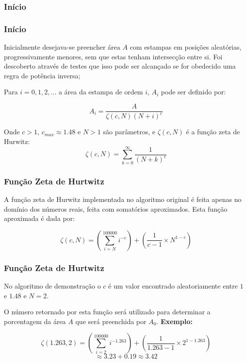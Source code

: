 \documentclass[aspectratio=169,11pt,red]{beamer}
\begin{document}
\subsubsection{Início}
\begin{frame}
\frametitle{Início}

Inicialmente desejava-se preencher área $A$ com estampas em posições aleatórias, progressivamente menores, sem que estas tenham intersecção entre si. Foi descoberto através de testes que isso pode ser alcançado se for obedecido uma regra de potência inversa;
\medskip
\pause

Para $i=0, 1, 2, ...$ a área da estampa de ordem $i$, $A_{i}$ pode ser definido por:
\medskip

\begin{equation}
A_{i} = \dfrac{A}{\zeta(c,N)(N+i)^c}
\end{equation}
\medskip

Onde $c>1$, $c_{max}\approx1.48$ e $N>1$ são parâmetros, e $\zeta(c,N)$ é a função zeta de Hurwitz: $$\zeta(c,N)=\sum\limits_{k=0}^\infty\dfrac{1}{(N+k)^c}$$
\medskip

\end{frame}

\begin{frame}
\frametitle{Função Zeta de Hurtwitz}

A função zeta de Hurwitz implementada no algoritmo original é feita apenas no domínio dos números reais, feita com somatórios aproximados. Esta função aproximada é dada por:
\medskip

\begin{equation}
\zeta(c,N) = (\sum\limits_{i=N}^{100000} i^{-c})+(\dfrac{1}{c-1} \times N^{1-c})
\end{equation}

\end{frame}

\begin{frame}
\frametitle{Função Zeta de Hurtwitz}

No algoritmo de demonstração o $c$ é um valor encontrado aleatoriamente entre $1$ e $1.48$ e $N=2$.
\medskip

O número retornado por esta função será utilizado para determinar a porcentagem da área $A$ que será preenchida por $A_{0}$. \pause \textbf{Exemplo:}
\medskip

\begin{equation}
\zeta(1.263,2) = (\sum\limits_{i=2}^{100000} i^{-1.263})+(\dfrac{1}{1.263-1} \times 2^{1-1.263})
\end{equation}
$$\approx 3.23 + 0.19 \approx 3.42$$

\end{frame}
\end{document}
